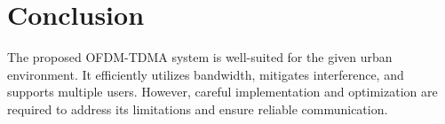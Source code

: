 \documentclass[12pt]{article}
\begin{document}
\section*{Conclusion}
The proposed OFDM-TDMA system is well-suited for the given urban environment. It efficiently utilizes bandwidth, mitigates interference, and supports multiple users. However, careful implementation and optimization are required to address its limitations and ensure reliable communication.
\end{document}
